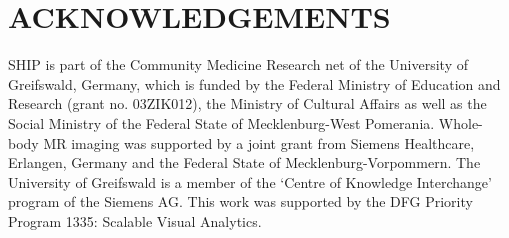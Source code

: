\documentclass[a4paper,twoside]{style/article}
\begin{document}
\section*{\uppercase{Acknowledgements}}
\noindent SHIP is part of the Community Medicine Research net of the University of Greifswald, Germany, which is funded by the Federal Ministry of Education and Research (grant no. 03ZIK012), the Ministry of Cultural Affairs as well as the Social Ministry of the Federal State of Mecklenburg-West Pomerania. Whole-body MR imaging was supported by a joint grant from Siemens Healthcare, Erlangen, Germany and the Federal State of Mecklenburg-Vorpommern. The University of Greifswald is a member of the ‘Centre of Knowledge Interchange’ program of the Siemens AG. This work was supported by the DFG Priority Program 1335: Scalable Visual Analytics.


\vfill

{\small
}


\vfill
\end{document}
